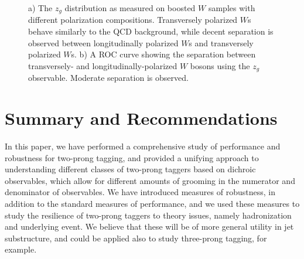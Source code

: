 \documentclass[11pt,letterpaper]{article}
\begin{document}
\begin{figure}
\begin{center}
\end{center}
\caption{a) The $z_g$ distribution as measured on boosted $W$ samples with different polarization compositions. Transversely polarized $W$s behave similarly to the QCD background, while decent separation is observed between longitudinally polarized $W$s and transversely polarized $W$s. b) A ROC curve showing the separation between transversely- and longitudinally-polarized $W$ bosons using the $z_g$ observable. Moderate separation is observed.}
\end{figure}



\section{Summary and Recommendations}\label{sec:conc}

In this paper, we have performed a comprehensive study of performance and robustness for two-prong tagging, and provided a unifying approach to understanding different classes of two-prong taggers based on dichroic observables, which allow for different amounts of grooming in the numerator and denominator of observables.  We have introduced measures of robustness, in addition to the standard measures of performance, and we used these measures to study the resilience of two-prong taggers to theory issues, namely hadronization and underlying event.  We believe that these will be of more general utility in jet substructure, and could be applied also to study three-prong tagging, for example.
\end{document}
